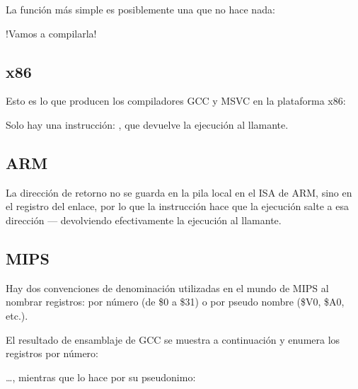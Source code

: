 \label{empty_func}

La función más simple es posiblemente una que no hace nada:



!Vamos a compilarla!

\subsection{x86}

Esto es lo que producen los compiladores GCC y MSVC en la plataforma x86:



Solo hay una instrucción: \RET, que devuelve la ejecución al \gls {llamante}.

\subsection{ARM}



La dirección de retorno no se guarda en la pila local en el \ac{ISA} de ARM, sino en el registro del enlace, por lo que la instrucción  hace que la ejecución salte a esa dirección --- devolviendo efectivamente la ejecución al \gls{llamante}.

\subsection{MIPS}

Hay dos convenciones de denominación utilizadas en el mundo de MIPS al nombrar registros:
por número (de \$0 a \$31) o por pseudo nombre (\$V0, \$A0, etc.).

El resultado de ensamblaje de GCC se muestra a continuación y enumera los registros por número:



\dots, mientras que \IDA lo hace por su  pseudonimo:



